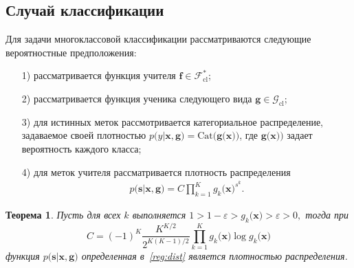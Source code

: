 \documentclass[12pt, twoside]{article}
\newtheorem{theorem}{Теорема}
\begin{document}
\subsection{Случай классификации}
Для задачи многоклассовой классификации рассматриваются следующие вероятностные предположения:
\begin{enumerate}
\label{st:class:1}
	\item[1)] рассматривается функция учителя $\mathbf{f}\in\mathcal{F}_{\text{cl}}^{*}$;
	\item[2)] рассматривается функция ученика следующего вида $\mathbf{g}\in\mathcal{G}_{\text{cl}}$;
	\item[3)] для истинных меток рассмотривается категориальное распределение, задаваемое своей плотностью $p\bigr(y|\mathbf{x}, \mathbf{g}\bigr) = \text{Cat}\bigr(\mathbf{g}\bigr(\mathbf{x}\bigr)\bigr)$, где $\mathbf{g}\bigr(\mathbf{x}\bigr)\bigr)$ задает вероятность каждого класса;
	\item[4)] для меток учителя рассматривается плотность распределения
\[
\label{reg:dist}
\begin{aligned}
	p\bigr(\mathbf{s}|\mathbf{x}, \mathbf{g}\bigr) = C\prod_{k=1}^{K}g_k\bigr(\mathbf{x}\bigr)^{s^k}.
\end{aligned}
\]
\end{enumerate}
\begin{theorem}
\label{theorem:st:dist}
Пусть для всех $k$ выполняется $1 > 1- \varepsilon > g_k\bigr(\mathbf{x}\bigr) > \varepsilon > 0,$ тогда при 
\[
C=\left(-1\right)^{K}\frac{K^{K/2}}{2^{K(K-1)/2}}\prod_{k=1}^{K}g_k\bigr(\mathbf{x}\bigr)\log g_k\bigr(\mathbf{x}\bigr)
\]
функция $p\bigr(\mathbf{s}|\mathbf{x}, \mathbf{g}\bigr)$ определенная в~\eqref{reg:dist} является плотностью распределения.
\end{theorem}
\end{document}
